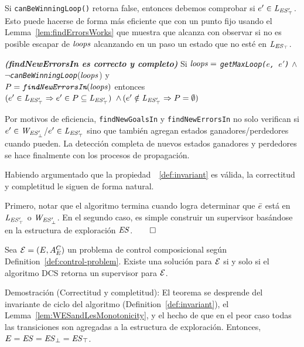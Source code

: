Si \texttt{canBeWinningLoop()} retorna false, entonces debemos comprobar si $e' \in \mathit{L_{\mathit{\mathit{ES}'_{\top}}}}$.
Esto puede hacerse de forma más eficiente que con un punto fijo usando el Lemma~\ref{lem:findErrorsWorks} que muestra que alcanza con observar si no es posible escapar de $\mathit{loops}$ alcanzando en un paso un estado que no esté en $\mathit{L_{\mathit{\mathit{ES}_{\top}}}}$. 



\begin{lemma}\textbf{\emph{(findNewErrorsIn es correcto y completo)}}
\label{lem:findErrorsWorks}
Si $\mathit{loops} =$ \emph{\texttt{getMaxLoop($e$, $e'$)}} $\wedge$\\ 
$\neg$\emph{\texttt{canBeWinningLoop}}($\mathit{loops}$) y \\
$P=\emph{\texttt{findNewErrorsIn}}(\mathit{loops})$ entonces \\
$(e' \in \mathit{L_{\mathit{\mathit{ES}'_{\top}}}} \Rightarrow e' \in P 
\subseteq \mathit{L_{\mathit{\mathit{ES}'_{\top}}}})$ $\wedge \, (e' \notin \mathit{L_{\mathit{\mathit{ES}'_{\top}}}} \Rightarrow P = 
\emptyset)$
\end{lemma}



Por motivos de eficiencia, \texttt{findNewGoalsIn} y
\texttt{findNewErrorsIn} no solo verifican si $e' \in \mathit{W_{\mathit{\mathit{ES}'_{\bot}}}}$/$e' \in 
\mathit{L_{\mathit{\mathit{ES}'_{\top}}}}$ sino que también agregan estados ganadores/perdedores cuando pueden. La detección completa de nuevos estados ganadores y perdedores se hace finalmente con los procesos de propagación. 

Habiendo argumentado que la propiedad~~\ref{def:invariant} es válida, la correctitud y completitud le siguen de forma natural. 

Primero, notar que el algoritmo termina cuando logra determinar que $\bar{e}$ está en $\mathit{L_{\mathit{\mathit{ES}'_{\top}}}}$ o $\mathit{W_{\mathit{\mathit{ES}'_{\bot}}}}$. En el segundo caso, es simple construir un supervisor basándose en la estructura de exploración
$\mathit{ES}$.\hfill$\qed$

\begin{theorem}
Sea $\mathcal{E} = (E,A_E^C)$ un problema de control composicional según Definition~\ref{def:control-problem}. Existe una solución para $\mathcal{E}$ si y solo si el algoritmo DCS retorna un supervisor para $\mathcal{E}$.
\end{theorem}

Demostración (Correctitud y completitud):
El teorema se desprende del invariante de ciclo del algoritmo (Definition~\ref{def:invariant}), el
Lemma~\ref{lem:WESandLesMonotonicity}, y el hecho de que en el peor caso todas las transiciones son agregadas a la estructura de exploración. Entonces,  $E = \mathit{ES} = 
\mathit{\mathit{ES}_{\bot}} = \mathit{\mathit{ES}_{\top}}$.
